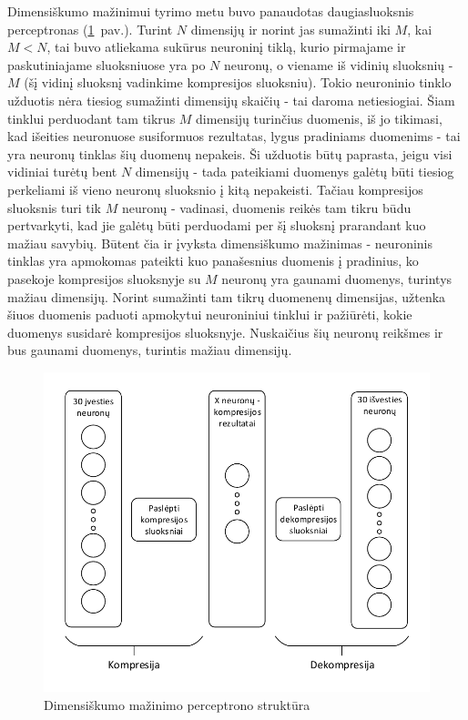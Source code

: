 \documentclass{VUMIFPSbakalaurinis}
\begin{document}
Dimensiškumo mažinimui tyrimo metu buvo panaudotas daugiasluoksnis perceptronas (\ref{fig:compression_perceptron}~pav.).
Turint $N$ dimensijų ir norint jas sumažinti iki $M$, kai $M < N$, tai buvo atliekama sukūrus neuroninį tiklą, kurio pirmajame ir paskutiniajame sluoksniuose yra po $N$ neuronų, o viename iš vidinių sluoksnių - $M$ (šį vidinį sluoksnį vadinkime kompresijos sluoksniu).
Tokio neuroninio tinklo užduotis nėra tiesiog sumažinti dimensijų skaičių - tai daroma netiesiogiai.
Šiam tinklui perduodant tam tikrus $M$ dimensijų turinčius duomenis, iš jo tikimasi, kad išeities neuronuose susiformuos rezultatas, lygus pradiniams duomenims - tai yra neuronų tinklas šių duomenų nepakeis.
Ši užduotis būtų paprasta, jeigu visi vidiniai turėtų bent $N$ dimensijų - tada pateikiami duomenys galėtų būti tiesiog perkeliami iš vieno neuronų sluoksnio į kitą nepakeisti.
Tačiau kompresijos sluoksnis turi tik $M$ neuronų - vadinasi, duomenis reikės tam tikru būdu pertvarkyti, kad jie galėtų būti perduodami per šį sluoksnį prarandant kuo mažiau savybių.
Būtent čia ir įvyksta dimensiškumo mažinimas - neuroninis tinklas yra apmokomas pateikti kuo panašesnius duomenis į pradinius, ko pasekoje kompresijos sluoksnyje su $M$ neuronų yra gaunami duomenys, turintys mažiau dimensijų.
Norint sumažinti tam tikrų duomenenų dimensijas, užtenka šiuos duomenis paduoti apmokytui neuroniniui tinklui ir pažiūrėti, kokie duomenys susidarė kompresijos sluoksnyje.
Nuskaičius šių neuronų reikšmes ir bus gaunami duomenys, turintis mažiau dimensijų.

\begin{figure}
	\includegraphics[scale=0.75]{diagrams/compression_perceptron}
	\caption{Dimensiškumo mažinimo perceptrono struktūra}
	\label{fig:compression_perceptron}
\end{figure}
\end{document}
